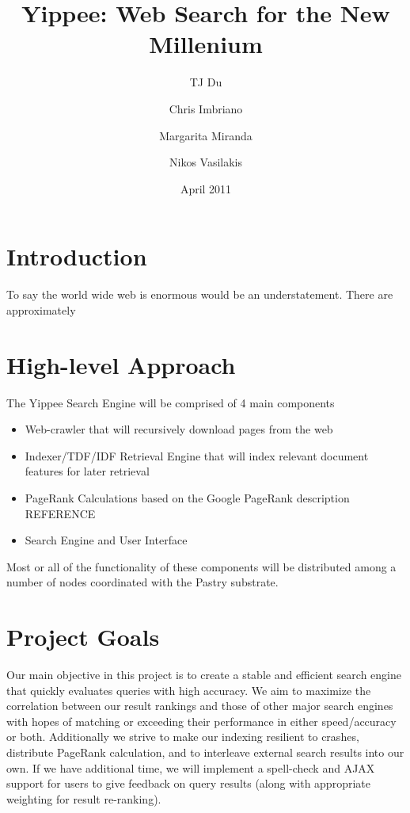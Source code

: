 \documentclass[11pt, letterpaper, oneside, twocolumn]{article}
\begin{document}
\title{Yippee: Web Search for the New Millenium}
\author{	TJ Du
	\and Chris Imbriano
	\and Margarita Miranda
	\and Nikos Vasilakis}
\date{April 2011}

\maketitle

\section{ Introduction }

To say the world wide web is enormous would be an understatement.  There are approximately 

\section{ High-level Approach }

The Yippee Search Engine will be comprised of 4 main components
\begin{itemize}
\item Web-crawler that will recursively download pages from the web
\item Indexer/TDF/IDF Retrieval Engine that will index relevant document features for later retrieval 
\item PageRank Calculations based on the Google PageRank description REFERENCE
\item Search Engine and User Interface
\end{itemize}

Most or all of the functionality of these components will be distributed among a number of nodes coordinated with the Pastry substrate.

\section{ Project Goals }

Our main objective in this project is to create a stable and efficient search engine that quickly evaluates queries with high accuracy. We aim to maximize the correlation between our result rankings and those of other major search engines with hopes of matching or exceeding their performance in either speed/accuracy or both. Additionally we strive to make our indexing resilient to crashes, distribute PageRank calculation, and to interleave external search results into our own. If we have additional time, we will implement a spell-check and AJAX support for users to give feedback on query results (along with appropriate weighting for result re-ranking).
\end{document}
